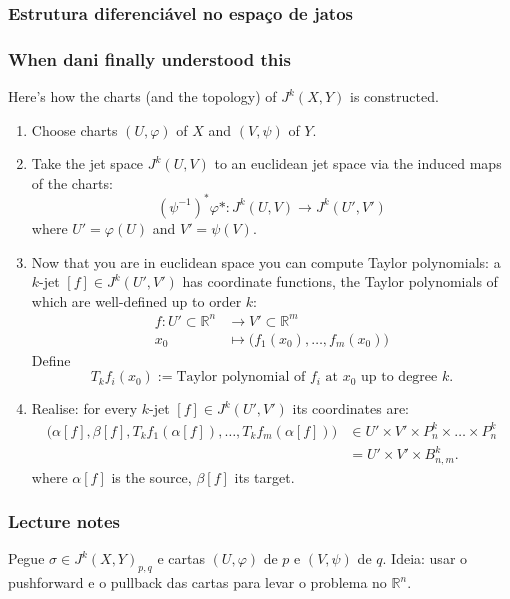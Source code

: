 \subsubsection{Estrutura diferenciável no espaço de jatos}

\subsubsection{When dani finally understood this}

Here's how the charts (and the topology) of \(J^k(X,Y)\) is constructed.
\begin{enumerate}
\item Choose charts \((U,\varphi)\) of \(X\) and \((V,\psi)\) of \(Y\).

 \item Take the jet space \(J^{k}(U,V)\) to an euclidean jet space via the induced maps of the charts:
	 \[(\psi^{-1})^*\varphi*:J^{k}(U,V)\to J^{k}(U',V')\]
	where \(U'=\varphi(U)\) and \(V'=\psi(V)\).

\item Now that you are in euclidean space you can compute Taylor polynomials: a  \(k\)-jet \([f]\in J^{k}(U',V')\) has coordinate functions, the Taylor polynomials of which are well-defined up to order \(k\):
	\begin{align*}
		f: U' \subset \mathbb{R}^n &\longrightarrow V' \subset \mathbb{R}^m \\
		x_0 &\longmapsto \Big(f_1(x_0),\ldots,f_m(x_0) \Big)
	\end{align*}
Define
\[T_kf_i(x_0):=\text{Taylor polynomial of \(f_i\) at \(x_0\) up to degree \(k\)}. \]
\item Realise: for every \(k\)-jet \([f] \in J^{k}(U',V')\) its coordinates are:
	\begin{align*}
	\Big(\alpha[f],\beta[f],T_kf_1(\alpha[f]),\ldots,T_kf_m(\alpha[f]) \Big)&\in U' \times V'\times P^k_{n}\times\ldots\times P^k_n\\
	&=U' \times V' \times B^k_{n,m}.
	\end{align*}
	where \(\alpha[f]\) is the source, \(\beta[f]\) its target.

	 
\end{enumerate}

\subsubsection{Lecture notes}

Pegue \(\sigma \in J^k(X,Y)_{p,q}\) e cartas \((U,\varphi)\) de \(p\) e \((V,\psi)\) de $q$. {\color{4}Ideia:} usar o pushforward e o pullback das cartas para levar o problema no \(\mathbb{R}^n\).

